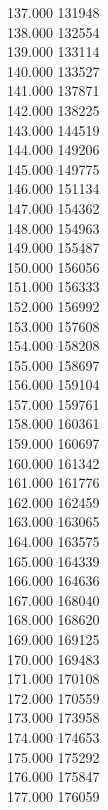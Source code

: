 { 137.000	131948 \\
 138.000	132554 \\
 139.000	133114 \\
 140.000	133527 \\
 141.000	137871 \\
 142.000	138225 \\
 143.000	144519 \\
 144.000	149206 \\
 145.000	149775 \\
 146.000	151134 \\
 147.000	154362 \\
 148.000	154963 \\
 149.000	155487 \\
 150.000	156056 \\
 151.000	156333 \\
 152.000	156992 \\
 153.000	157608 \\
 154.000	158208 \\
 155.000	158697 \\
 156.000	159104 \\
 157.000	159761 \\
 158.000	160361 \\
 159.000	160697 \\
 160.000	161342 \\
 161.000	161776 \\
 162.000	162459 \\
 163.000	163065 \\
 164.000	163575 \\
 165.000	164339 \\
 166.000	164636 \\
 167.000	168040 \\
 168.000	168620 \\
 169.000	169125 \\
 170.000	169483 \\
 171.000	170108 \\
 172.000	170559 \\
 173.000	173958 \\
 174.000	174653 \\
 175.000	175292 \\
 176.000	175847 \\
 177.000	176059 \\
}
